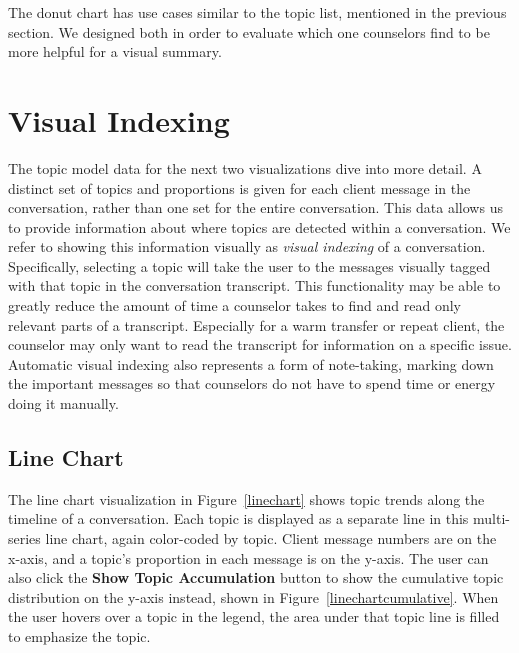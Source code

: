 The donut chart has use cases similar to the topic list, mentioned in the previous
section. We designed both in order to evaluate which one counselors find to be more
helpful for a visual summary.

\section{Visual Indexing}

The topic model data for the next two visualizations dive into more detail. A distinct
set of topics and proportions is given for each client message in the conversation, rather
than one set for the entire conversation. This data allows us to provide information
about where topics are detected within a conversation. We refer to showing this
information visually as \textit{visual indexing} of a conversation. Specifically, selecting a topic
will take the user to the messages visually tagged with that topic in the conversation
transcript. This functionality may be able to greatly reduce the amount of time a
counselor takes to find and read only relevant parts of a transcript. Especially for a
warm transfer or repeat client, the counselor may only want to read the transcript
for information on a specific issue. Automatic visual indexing also represents a form
of note-taking, marking down the important messages so that counselors do not have
to spend time or energy doing it manually.

\subsection{Line Chart}

The line chart visualization in Figure~\ref{linechart} shows topic trends along the timeline of
a conversation. Each topic is displayed as a separate line in this multi-series line
chart, again color-coded by topic. Client message numbers are on the x-axis, and
a topic's proportion in each message is on the y-axis. The user can also click the
\textbf{Show Topic Accumulation} button to show the cumulative topic distribution
on the y-axis instead, shown in Figure~\ref{linechartcumulative}. When the user hovers over a topic in the
legend, the area under that topic line is filled to emphasize the topic.

